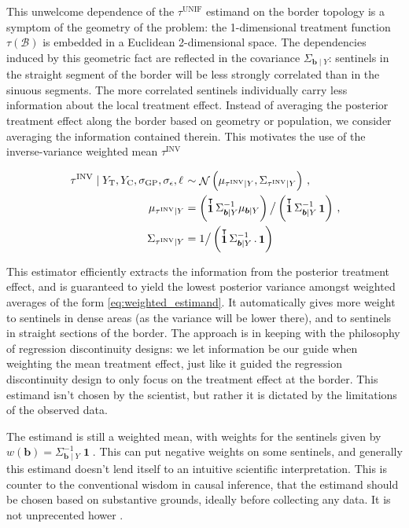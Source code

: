 \documentclass[letter]{article}
\DeclareMathOperator{\normal}{\mathcal{N}}
\DeclareMathOperator{\ones}{\mathbf{1}}
\newcommand{\trans}{^{\intercal}}
\newcommand{\treat}{\mathrm{T}}
\newcommand{\ctrol}{\mathrm{C}}
\newcommand{\sigmaf}{\sigma_{\mathrm{GP}}}
\newcommand{\sigman}{\sigma_{\epsilon}}
\newcommand{\boundary}{\mathcal{B}}
\newcommand{\sentinels}{\bm{b}}
\newcommand{\unifavg}{\tau^{\mathrm{UNIF}}}
\newcommand{\invvar}{\tau^{\mathrm{INV}}}
\newcommand{\eqlabel}[1]{\label{#1}}
\renewcommand{\cite}[1]{\citep{#1}}
\begin{document}
This unwelcome dependence of the \(\unifavg\) estimand on the border topology is a symptom of the geometry of the problem: the 1-dimensional treatment function \(\tau(\boundary)\) is embedded in a Euclidean 2-dimensional space.
The dependencies induced by this geometric fact are reflected in the covariance \(\Sigma_{\sentinels \mid Y}\): sentinels in the straight segment of the border will be less strongly correlated than in the sinuous segments.
The more correlated sentinels individually carry less information about the local treatment effect.
Instead of averaging the posterior treatment effect along the border based on geometry or population, we consider averaging the information contained therein.
This motivates the use of the inverse-variance weighted mean \(\invvar\)

\begin{equation}
\begin{split}
    \left. \invvar \mid Y_\treat{}, Y_\ctrol{}, \sigmaf, \sigman, \ell \right. &\sim \normal\del{\mu_{\invvar \mid Y}, \Sigma_{\invvar \mid Y}} \,, \\
    \mu_{\invvar \mid Y} &= \del{\ones\trans \Sigma_{\sentinels \mid Y}^{-1} \mu_{\sentinels \mid Y}} \big/ \del{\ones\trans \Sigma_{\sentinels \mid Y}^{-1} \ones} \,, \\
    \Sigma_{\invvar \mid Y} &= 1 \big/ \del{\ones\trans \Sigma_{\sentinels \mid Y}^{-1} \,. \ones}
\end{split}
\eqlabel{eq:invvar}
\end{equation}

This estimator efficiently extracts the information from the posterior treatment effect, and is guaranteed to yield the lowest posterior variance amongst weighted averages of the form \eqref{eq:weighted_estimand}.
It automatically gives more weight to sentinels in dense areas (as the variance will be lower there), and to sentinels in straight sections of the border.
The approach is in keeping with the philosophy of regression discontinuity designs: we let information be our guide when weighting the mean treatment effect, just like it guided the regression discontinuity design to only focus on the treatment effect at the border.
This estimand isn't chosen by the scientist, but rather it is dictated by the limitations of the observed data.

The estimand is still a weighted mean, with weights for the sentinels given by \(w(\sentinels) = \Sigma_{\sentinels \mid Y}^{-1} \ones\).
This can put negative weights on some sentinels, and generally this estimand doesn't lend itself to an intuitive scientific interpretation.
This is counter to the conventional wisdom in causal inference, that the estimand should be chosen based on substantive grounds, ideally before collecting any data.
It is not unprecented hower \cite{li2016balancing}.
    
\end{document}
